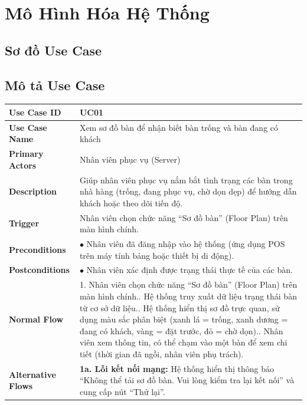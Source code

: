 \section{Mô Hình Hóa Hệ Thống}
\subsection{Sơ đồ Use Case}


\subsection{Mô tả Use Case}


\begin{longtable}{|p{3.5cm}|p{12.5cm}|}
\hline
\textbf{Use Case ID} & UC01 \\ \hline
\textbf{Use Case Name} & Xem sơ đồ bàn để nhận biết bàn trống và bàn đang có khách \\ \hline
\textbf{Primary Actors} & Nhân viên phục vụ (Server) \\ \hline
\textbf{Description} & Giúp nhân viên phục vụ nắm bắt tình trạng các bàn trong nhà hàng (trống, đang phục vụ, chờ dọn dẹp) để hướng dẫn khách hoặc theo dõi tiến độ. \\ \hline
\textbf{Trigger} & Nhân viên chọn chức năng ``Sơ đồ bàn'' (Floor Plan) trên màn hình chính. \\ \hline
\textbf{Preconditions} & $\bullet$ Nhân viên đã đăng nhập vào hệ thống (ứng dụng POS trên máy tính bảng hoặc thiết bị di động). \\ \hline
\textbf{Postconditions} & $\bullet$ Nhân viên xác định được trạng thái thực tế của các bàn. \\ \hline
\textbf{Normal Flow} &
1. Nhân viên chọn chức năng ``Sơ đồ bàn'' (Floor Plan) trên màn hình chính.\newline
2. Hệ thống truy xuất dữ liệu trạng thái bàn từ cơ sở dữ liệu.\newline
3. Hệ thống hiển thị sơ đồ trực quan, sử dụng màu sắc phân biệt (xanh lá = trống, xanh dương = đang có khách, vàng = đặt trước, đỏ = chờ dọn).\newline
4. Nhân viên xem thông tin, có thể chạm vào một bàn để xem chi tiết (thời gian đã ngồi, nhân viên phụ trách). \\ \hline
\textbf{Alternative Flows} &
\textbf{1a. Lỗi kết nối mạng:} Hệ thống hiển thị thông báo ``Không thể tải sơ đồ bàn. Vui lòng kiểm tra lại kết nối'' và cung cấp nút ``Thử lại''. \\ \hline
\end{longtable}


